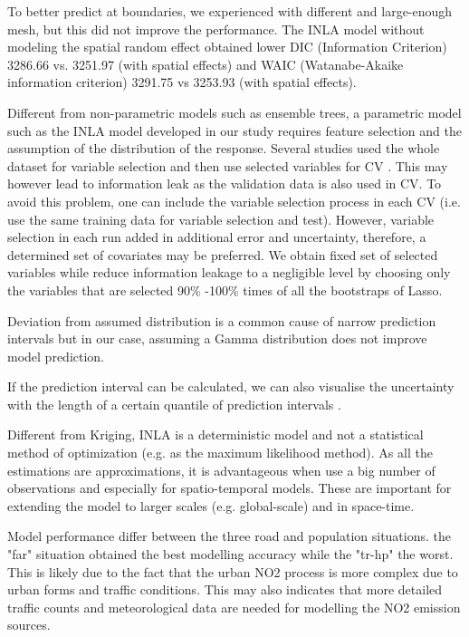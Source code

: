 \documentclass{article}
\begin{document}
To better predict at boundaries, we experienced with different and large-enough mesh, but this did not improve the performance.
The INLA model without modeling the spatial random effect obtained lower DIC (Information Criterion) 3286.66 vs. 3251.97 (with spatial effects) and WAIC (Watanabe-Akaike information criterion) 3291.75 vs 3253.93 (with spatial effects).  

Different from non-parametric models such as ensemble trees, a parametric model such as the INLA model developed in our study requires feature selection and the assumption of the distribution of the response. Several studies used the whole dataset for variable selection and then use selected variables for CV \citep{lu2020land,larkin2017global}. This may however lead to information leak as the validation data is also used in CV. To avoid this problem, one can include the variable selection process in each CV (i.e. use the same training data for variable selection and test). However, variable selection in each run added in additional error and uncertainty, therefore, a determined set of covariates may be preferred. We obtain fixed set of selected variables while reduce information leakage to a negligible level by choosing only the variables that are selected 90\% -100\% times of all the bootstraps of Lasso.


Deviation from assumed distribution is a common cause of narrow prediction intervals but in our case, assuming a Gamma distribution does not improve model prediction.     

If the prediction interval can be calculated, we can also visualise the uncertainty with the length of a certain quantile of prediction intervals \citep{shaddick2015spatio}.   

Different from Kriging, INLA is a deterministic model and not a statistical method of optimization (e.g. as the maximum likelihood method). As all the estimations are approximations, it is advantageous when use a big number of observations and especially for spatio-temporal models. These are important for extending the model to larger scales (e.g. global-scale) and in space-time. 

Model performance differ between the three road and population situations. the "far" situation obtained the best modelling accuracy while the "tr-hp" the worst. This is likely due to the fact that the urban NO2 process is more complex due to urban forms and traffic conditions. This may also indicates that more detailed traffic counts and meteorological data are needed for modelling the NO2 emission sources.  

\newpage



\end{document}
